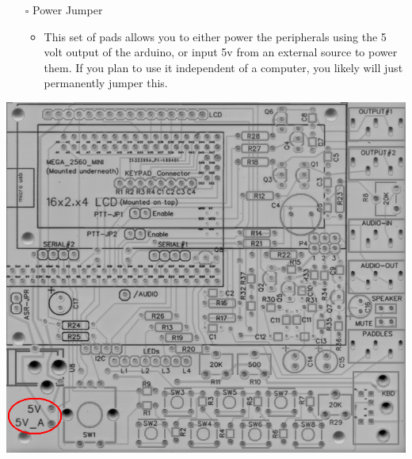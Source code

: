 \documentclass[11pt]{article}
\begin{document}
\newpage
\begin{itemize}
\item[{$\square$}] Power Jumper

\begin{itemize}
\item This set of pads allows you to either power the peripherals using the 5 volt output of the arduino, or input 5v from an external source to power them.  If you plan to use it independent of a computer, you likely will just permanently jumper this.
\end{itemize}
\end{itemize}
\begin{center}
\includegraphics[width=.9\linewidth]{../png/3.5/pcb-top-power-jumper.png}
\end{center}
\end{document}

